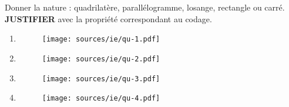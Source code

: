 \documentclass[11pt]{article}
\begin{document}
Donner la nature : quadrilatère, parallélogramme, losange, rectangle ou carré. \textbf{JUSTIFIER} avec la propriété correspondant au codage.
\begin{multicols}{2}
  \begin{enumerate}
  \item 
    \begin{figure}[H]
      \centering
      \texttt{[image: sources/ie/qu-1.pdf]}
    \end{figure}
  \item
    \begin{figure}[H]
      \centering
      \texttt{[image: sources/ie/qu-2.pdf]}
    \end{figure}
  \item 
    \begin{figure}[H]
      \centering
      \texttt{[image: sources/ie/qu-3.pdf]}
    \end{figure}
  \item  
    \begin{figure}[H]
      \centering
      \texttt{[image: sources/ie/qu-4.pdf]}
    \end{figure}
  \end{enumerate}
\end{multicols}
\end{document}
